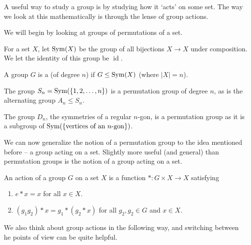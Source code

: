 \documentclass[a4paper]{scrartcl}
\begin{document}

A useful way to study a group is by studying how it `acts' on some set.
The way we look at this mathematically is through the lense of group actions.


We will begin by looking at groups of permutations of a set.

\begin{definition}[$\sym(X)$]
	For a set $X$, let $\sym(X)$ be the group of all bijections $X \rightarrow X$ under composition. We let the identity of this group be $\operatorname{id}$.
\end{definition}

\begin{definition}
	A group $G$ is a  (of degree $n$) if $G \leq \operatorname{Sym}(X)$ (where $|X| = n$).
\end{definition}

\begin{example}
	The group $S_n = \operatorname{Sym}(\{1, 2, \dots, n\})$ is a permutation group of degree $n$, as is the alternating group $A_n \leq S_n$.

	The group $D_n$, the symmetries of a regular $n$-gon, is a permutation group as it is a subgroup of $\operatorname{Sym}(\{\text{vertices of an $n$-gon}\})$.
\end{example}

We can now generalize the notion of a permutation group to the idea mentioned before -- a group acting on a set.
Slightly more useful (and general) than permutation groups is the notion of a group acting on a set.

\begin{definition}
	An action of a group $G$ on a set $X$ is a function $*: G \times X \rightarrow X$ satisfying
	\begin{enumerate}[label=(\roman*)]
		\item $e * x = x$ for all $x \in X$.
		\item $(g_1 g_2) * x = g_1 * (g_2 * x)$ for all $g_2, g_2 \in G$ and $x \in X$.
	\end{enumerate}
\end{definition}

We also think about group actions in the following way, and switching between he points of view can be quite helpful.
\end{document}
